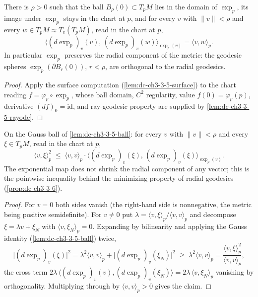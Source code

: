 \begin{lemma}
  \label{lem:dc-ch3-3-5-ball}
  \leanok
  There is $\rho > 0$ such that the ball $B_\rho(0) \subset T_pM$ lies in the
  domain of $\exp_p$, its image under $\exp_p$ stays in the chart at $p$, and
  for every $v$ with $\|v\| < \rho$ and every
  $w \in T_pM \approx T_v(T_pM)$, read in the chart at $p$,
  $$\big\langle (d\exp_p)_v(v),\, (d\exp_p)_v(w) \big\rangle_{\exp_p(v)}
    = \langle v, w\rangle_p.$$
  In particular $\exp_p$ preserves the radial component of the metric: the
  geodesic spheres $\exp_p(\partial B_r(0))$, $r < \rho$, are orthogonal to
  the radial geodesics.
\end{lemma}
\begin{proof}
  \sketch
  \leanok
  Apply the surface computation (\cref{lem:dc-ch3-3-5-surface}) to the chart
  reading $f = \varphi_p \circ \exp_p$, whose ball domain, $C^2$ regularity,
  value $f(0)=\varphi_p(p)$, derivative $(df)_0 = \mathrm{id}$, and
  ray-geodesic property are supplied by \cref{lem:dc-ch3-3-5-rayode}.

\end{proof}

\begin{lemma}
  \label{lem:dc-ch3-3-5-radial}
  \leanok
  On the Gauss ball of \cref{lem:dc-ch3-3-5-ball}: for every $v$ with
  $\|v\| < \rho$ and every $\xi \in T_pM$, read in the chart at $p$,
  $$\langle v, \xi\rangle_p^2
    \;\le\; \langle v, v\rangle_p \cdot
      \big\langle (d\exp_p)_v(\xi),\, (d\exp_p)_v(\xi)\big\rangle_{\exp_p(v)}.$$
  The exponential map does not shrink the radial component of any vector;
  this is the pointwise inequality behind the minimizing property of radial
  geodesics (\cref{prop:dc-ch3-3-6}).
\end{lemma}
\begin{proof}
  \sketch
  \leanok
  For $v = 0$ both sides vanish (the right-hand side is nonnegative, the
  metric being positive semidefinite). For $v \ne 0$ put
  $\lambda = \langle v,\xi\rangle_p / \langle v,v\rangle_p$ and decompose
  $\xi = \lambda v + \xi_N$ with $\langle v, \xi_N\rangle_p = 0$. Expanding by
  bilinearity and applying the Gauss identity (\cref{lem:dc-ch3-3-5-ball})
  twice,
  $$\big|(d\exp_p)_v(\xi)\big|^2
    = \lambda^2 \langle v,v\rangle_p
      + \big|(d\exp_p)_v(\xi_N)\big|^2
    \;\ge\; \lambda^2 \langle v,v\rangle_p
    = \frac{\langle v,\xi\rangle_p^2}{\langle v,v\rangle_p},$$
  the cross term $2\lambda\,\langle (d\exp_p)_v(v), (d\exp_p)_v(\xi_N)\rangle
  = 2\lambda\,\langle v, \xi_N\rangle_p$ vanishing by orthogonality.
  Multiplying through by $\langle v,v\rangle_p > 0$ gives the claim.

\end{proof}

